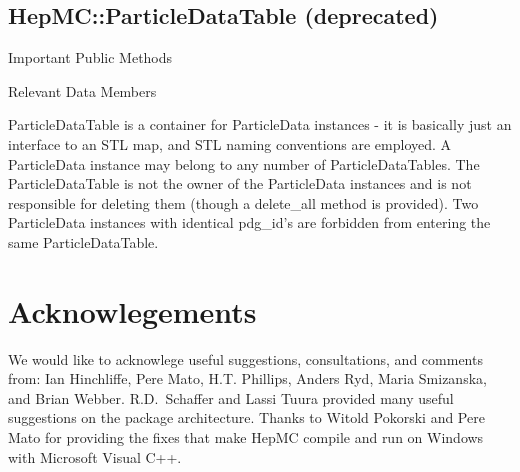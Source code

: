\documentclass[11pt,letterpaper]{article}
\begin{document}
\subsection{HepMC::ParticleDataTable (deprecated)}
\begin{myitemize}{Important Public Methods}
\end{myitemize}
\begin{myitemize}{Relevant Data Members}
\end{myitemize}

ParticleDataTable is a container for ParticleData instances - it is
basically just an interface to an STL map, and STL naming conventions
are employed. A ParticleData instance may belong to any number of
ParticleDataTables. The ParticleDataTable is not the owner of the
ParticleData instances and is not responsible for deleting them
(though a delete\_all method is provided). Two ParticleData instances
with identical pdg\_id's are forbidden from entering the same
ParticleDataTable. 

%
%

\section{Acknowlegements}

We would like to acknowlege useful suggestions, consultations, and
comments from: Ian Hinchliffe, Pere Mato, H.T. Phillips, Anders Ryd,
Maria Smizanska, and Brian Webber.  R.D.\ Schaffer and Lassi
Tuura provided many useful suggestions on the package architecture.
Thanks to Witold Pokorski and Pere Mato for providing the fixes that
make HepMC compile and run on Windows with Microsoft Visual C++.
\end{document}

